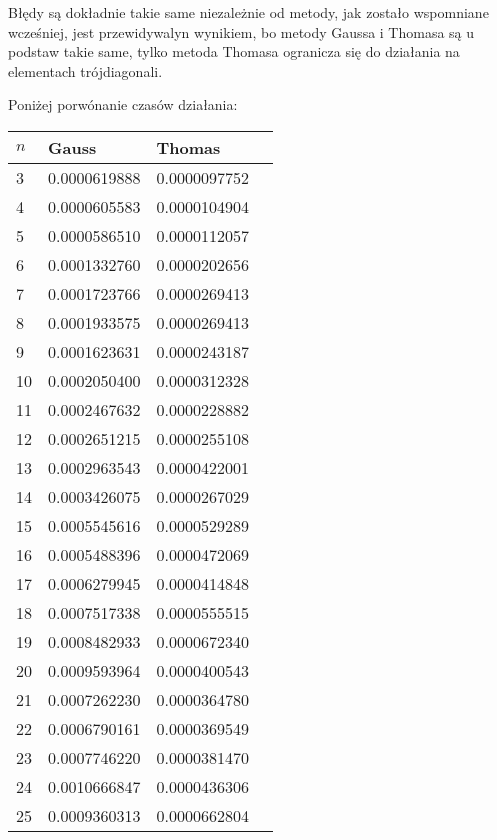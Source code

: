 \documentclass{article}
\begin{document}
Błędy są dokładnie takie same niezależnie od metody, jak zostało wspomniane wcześniej, jest przewidywalyn wynikiem, bo metody Gaussa
i Thomasa są u podstaw takie same, tylko metoda Thomasa ogranicza się do działania na elementach trójdiagonali.

Poniżej porwónanie czasów działania:

\newpage
\thispagestyle{empty}

\begin{table}[H]
\parbox{.45\linewidth}{
\hspace*{-1cm}
\begin{tabular}{|l|l|l|l|}
\hline
$n$ & Gauss & Thomas \\ \hline
3 & 0.0000619888 & 0.0000097752 \\ \hline
4 & 0.0000605583 & 0.0000104904 \\ \hline
5 & 0.0000586510 & 0.0000112057 \\ \hline
6 & 0.0001332760 & 0.0000202656 \\ \hline
7 & 0.0001723766 & 0.0000269413 \\ \hline
8 & 0.0001933575 & 0.0000269413 \\ \hline
9 & 0.0001623631 & 0.0000243187 \\ \hline
10 & 0.0002050400 & 0.0000312328 \\ \hline
11 & 0.0002467632 & 0.0000228882 \\ \hline
12 & 0.0002651215 & 0.0000255108 \\ \hline
13 & 0.0002963543 & 0.0000422001 \\ \hline
14 & 0.0003426075 & 0.0000267029 \\ \hline
15 & 0.0005545616 & 0.0000529289 \\ \hline
16 & 0.0005488396 & 0.0000472069 \\ \hline
17 & 0.0006279945 & 0.0000414848 \\ \hline
18 & 0.0007517338 & 0.0000555515 \\ \hline
19 & 0.0008482933 & 0.0000672340 \\ \hline
20 & 0.0009593964 & 0.0000400543 \\ \hline
21 & 0.0007262230 & 0.0000364780 \\ \hline
22 & 0.0006790161 & 0.0000369549 \\ \hline
23 & 0.0007746220 & 0.0000381470 \\ \hline
24 & 0.0010666847 & 0.0000436306 \\ \hline
25 & 0.0009360313 & 0.0000662804 \\ \hline

\end{tabular}}
\end{table}
\end{document}
